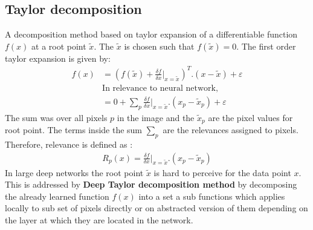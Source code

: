 \documentclass{article}
\begin{document}
	\subsection{Taylor decomposition}
	A decomposition method based on taylor expansion of a differentiable function $f(x)$ at a root point $\tilde{x}$. The $\tilde{x}$ is chosen such that $f(\tilde{x}) = 0$. The first order taylor expansion is given by:
	\begin{align}
		f(x) &= \left(f(\tilde{x}) + \frac{\delta f}{\delta x} \rvert_{x=\tilde{x}} \right)^{T}. (x - \tilde{x}) + \varepsilon \nonumber  \\
		& \text{In relevance to neural network,}  \nonumber \\
		&= 0+\sum_{p} \frac{\delta f}{\delta x} \rvert_{x = \tilde{x}}. (x_p - \tilde{x}_p) + \varepsilon 
	\end{align}
	The sum was over all pixels $p$ in the image and the ${\tilde{x}_p}$ are the pixel values for root point. The terms inside the sum $\sum_p$ are the relevances assigned to pixels. Therefore, relevance is defined as :
	\begin{align}
		R_p(x) = \frac{\delta f}{\delta x} \rvert_{x = \tilde{x}}. (x_p - \tilde{x}_p)
	\end{align}
	In large deep networks the root point $\tilde{x}$ is hard to perceive for the data point $x$.  \\
	
	This is addressed by \textbf{Deep Taylor decomposition method} by decomposing the already learned function $f(x)$ into a set a sub functions which applies locally to sub set of pixels directly or on abstracted version of them depending on the layer at which they are located in the network.
\end{document}
